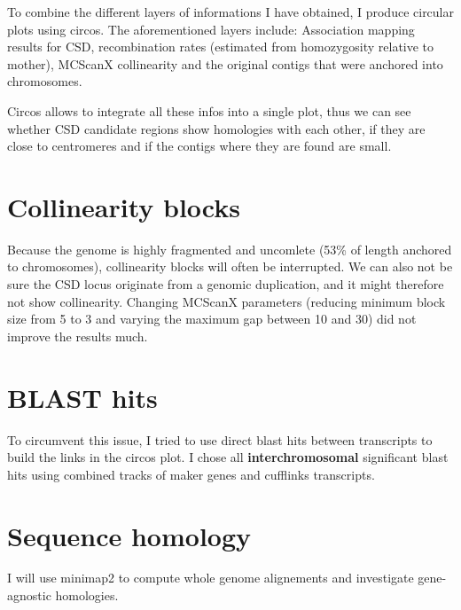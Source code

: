 \documentclass[10pt,a4paper]{report}
\begin{document}
To combine the different layers of informations I have obtained, I produce circular plots using circos. The aforementioned layers include: Association mapping results for CSD, recombination rates (estimated from homozygosity relative to mother), MCScanX collinearity and the original contigs that were anchored into chromosomes. 

Circos allows to integrate all these infos into a single plot, thus we can see whether CSD candidate regions show homologies with each other, if they are close to centromeres and if the contigs where they are found are small.\\

\section{Collinearity blocks}
Because the genome is highly fragmented and uncomlete (53\% of length anchored to chromosomes), collinearity blocks will often be interrupted. We can also not be sure the CSD locus originate from a genomic duplication, and it might therefore not show collinearity. Changing MCScanX parameters (reducing minimum block size from 5 to 3 and varying the maximum gap between 10 and 30) did not improve the results much.

\section{BLAST hits}
To circumvent this issue, I tried to use direct blast hits between transcripts to build the links in the circos plot. I chose all \textbf{interchromosomal} significant blast hits using combined tracks of maker genes and cufflinks transcripts.

\section{Sequence homology}
I will use minimap2 to compute whole genome alignements and investigate gene-agnostic homologies.
\end{document}
